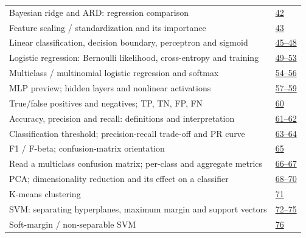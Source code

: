 \documentclass[10pt]{article}
\begin{document}
\begin{longtable}{@{}P{.79\linewidth}P{.17\linewidth}@{}}
Bayesian ridge and ARD: regression comparison & \href{../Lecture\%20Slides/1.2.\%20Shallow\%20Learning.pdf\#page=42}{42}\\[3pt]
Feature scaling / standardization and its importance & \href{../Lecture\%20Slides/1.2.\%20Shallow\%20Learning.pdf\#page=43}{43}\\[3pt]
Linear classification, decision boundary, perceptron and sigmoid & \href{../Lecture\%20Slides/1.2.\%20Shallow\%20Learning.pdf\#page=45}{45--48}\\[3pt]
Logistic regression: Bernoulli likelihood, cross-entropy and training & \href{../Lecture\%20Slides/1.2.\%20Shallow\%20Learning.pdf\#page=49}{49--53}\\[3pt]
Multiclass / multinomial logistic regression and softmax & \href{../Lecture\%20Slides/1.2.\%20Shallow\%20Learning.pdf\#page=54}{54--56}\\[3pt]
MLP preview; hidden layers and nonlinear activations & \href{../Lecture\%20Slides/1.2.\%20Shallow\%20Learning.pdf\#page=57}{57--59}\\[3pt]
True/false positives and negatives; TP, TN, FP, FN & \href{../Lecture\%20Slides/1.2.\%20Shallow\%20Learning.pdf\#page=60}{60}\\[3pt]
Accuracy, precision and recall: definitions and interpretation & \href{../Lecture\%20Slides/1.2.\%20Shallow\%20Learning.pdf\#page=61}{61--62}\\[3pt]
Classification threshold; precision-recall trade-off and PR curve & \href{../Lecture\%20Slides/1.2.\%20Shallow\%20Learning.pdf\#page=63}{63--64}\\[3pt]
F1 / F-beta; confusion-matrix orientation & \href{../Lecture\%20Slides/1.2.\%20Shallow\%20Learning.pdf\#page=65}{65}\\[3pt]
Read a multiclass confusion matrix; per-class and aggregate metrics & \href{../Lecture\%20Slides/1.2.\%20Shallow\%20Learning.pdf\#page=66}{66--67}\\[3pt]
PCA; dimensionality reduction and its effect on a classifier & \href{../Lecture\%20Slides/1.2.\%20Shallow\%20Learning.pdf\#page=68}{68--70}\\[3pt]
K-means clustering & \href{../Lecture\%20Slides/1.2.\%20Shallow\%20Learning.pdf\#page=71}{71}\\[3pt]
SVM: separating hyperplanes, maximum margin and support vectors & \href{../Lecture\%20Slides/1.2.\%20Shallow\%20Learning.pdf\#page=72}{72--75}\\[3pt]
Soft-margin / non-separable SVM & \href{../Lecture\%20Slides/1.2.\%20Shallow\%20Learning.pdf\#page=76}{76}\\[3pt]

\end{longtable}
\end{document}

